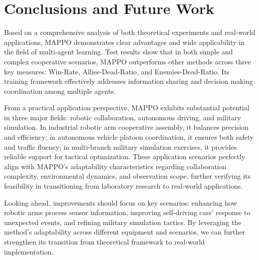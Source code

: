 \section{Conclusions and Future Work}\label{sec:conclusion}

Based on a comprehensive analysis of both theoretical experiments and real-world applications, MAPPO demonstrates clear advantages and wide applicability in the field of multi-agent learning. Test results show that in both simple and complex cooperative scenarios, MAPPO outperforms other methods across three key measures: Win-Rate, Allies-Dead-Ratio, and Enemies-Dead-Ratio. Its training framework effectively addresses information sharing and decision making coordination among multiple agents.

From a practical application perspective, MAPPO exhibits substantial potential in three major fields: robotic collaboration, autonomous driving, and military simulation. In industrial robotic arm cooperative assembly, it balances precision and efficiency; in autonomous vehicle platoon coordination, it ensures both safety and traffic fluency; in multi-branch military simulation exercises, it provides reliable support for tactical optimization. These application scenarios perfectly align with MAPPO's adaptability characteristics regarding collaboration complexity, environmental dynamics, and observation scope, further verifying its feasibility in transitioning from laboratory research to real-world applications.

Looking ahead, improvements should focus on key scenarios: enhancing how robotic arms process sensor information, improving self-driving cars' response to unexpected events, and refining military simulation tactics. By leveraging the method's adaptability across different equipment and scenarios, we can further strengthen its transition from theoretical framework to real-world implementation.